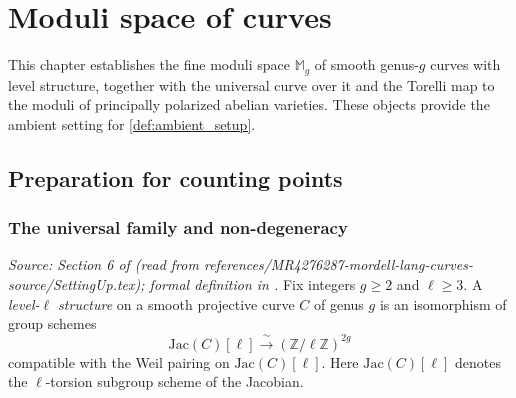 \chapter{Moduli space of curves}
\label{chap:moduli}

This chapter establishes the fine moduli space \(\mathbb{M}_g\) of smooth genus-\(g\) curves
with level structure, together with the universal curve over it and the Torelli map to the
moduli of principally polarized abelian varieties. These objects provide the ambient setting
for \cref{def:ambient_setup}.

\section{Preparation for counting points}

\subsection{The universal family and non-degeneracy}

\begin{definition}
  \label{def:level_structure}
  \textit{Source: Section 6 of \cite{MR4276287-mordell-lang-curves} (read from references/MR4276287-mordell-lang-curves-source/SettingUp.tex); formal definition in \cite[Theorem~1.8]{OortSteenbrink}.}
  Fix integers \(g \ge 2\) and \(\ell \ge 3\). A \emph{level-\(\ell\) structure} on a smooth
  projective curve \(C\) of genus \(g\) is an isomorphism of group schemes
  \[
    \mathrm{Jac}(C)[\ell] \xrightarrow{\;\sim\;} (\mathbb{Z}/\ell\mathbb{Z})^{2g}
  \]
  compatible with the Weil pairing on \(\mathrm{Jac}(C)[\ell]\). Here \(\mathrm{Jac}(C)[\ell]\)
  denotes the \(\ell\)-torsion subgroup scheme of the Jacobian.
\end{definition}

